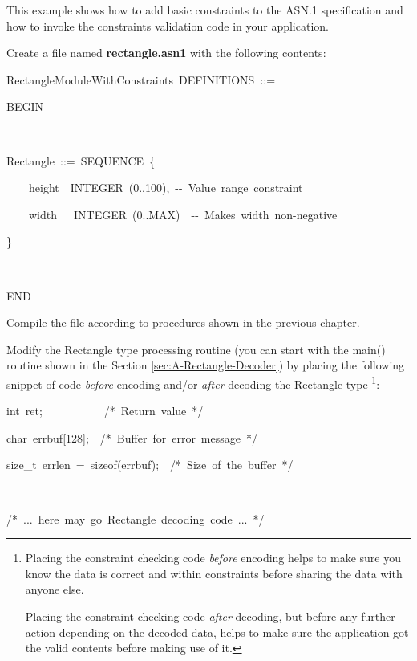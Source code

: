 \documentclass[english,oneside,12pt]{book}
\newenvironment{lyxcode}
{\par\begin{list}{}{
\setlength{\rightmargin}{\leftmargin}
\setlength{\listparindent}{0pt}%
\raggedright
\setlength{\itemsep}{0pt}
\setlength{\parsep}{0pt}
\normalfont\ttfamily}%
 \item[]}
{\end{list}}
\begin{document}
This example shows how to add basic constraints to the ASN.1 specification
and how to invoke the constraints validation code in your application.
\begin{enumerate}
\item Create a file named \textbf{rectangle.asn1} with the following contents:

\begin{lyxcode}
RectangleModuleWithConstraints~DEFINITIONS~::=

BEGIN

~

Rectangle~::=~SEQUENCE~\{

~~~~height~~INTEGER~(0..100),~-{}-~Value~range~constraint

~~~~width~~~INTEGER~(0..MAX)~~-{}-~Makes~width~non-negative~

\}

~

END
\end{lyxcode}
\item Compile the file according to procedures shown in the previous chapter.
\item Modify the Rectangle type processing routine (you can start with the
main() routine shown in the Section \vref{sec:A-Rectangle-Decoder})
by placing the following snippet of code \emph{before} encoding and/or
\emph{after} decoding the Rectangle type%
\footnote{Placing the constraint checking code \emph{before} encoding helps
to make sure you know the data is correct and within constraints before
sharing the data with anyone else.

Placing the constraint checking code \emph{after} decoding, but before
any further action depending on the decoded data, helps to make sure
the application got the valid contents before making use of it.%
}:\clearpage{}

\begin{lyxcode}
{\small int~ret;~~~~~~~~~~~/{*}~Return~value~{*}/}{\small \par}

{\small char~errbuf{[}128{]};~~/{*}~Buffer~for~error~message~{*}/}{\small \par}

{\small size\_t~errlen~=~sizeof(errbuf);~~/{*}~Size~of~the~buffer~{*}/}{\small \par}

{\small{}~~}{\small \par}

{\small /{*}~...~here~may~go~Rectangle~decoding~code~...~{*}/}{\small \par}


\end{lyxcode}
\end{enumerate}
\end{document}
